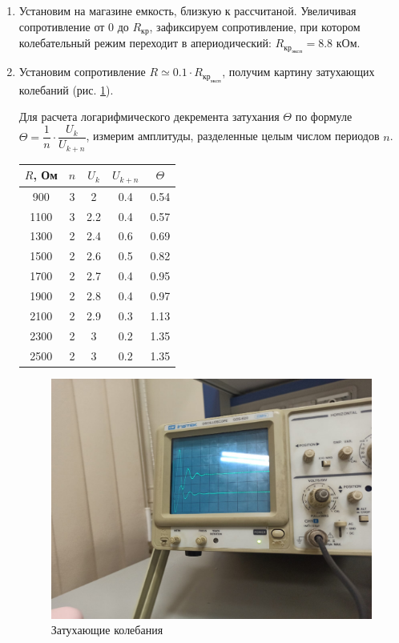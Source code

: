 \documentclass[a4paper, 12pt]{article}
\begin{document}
\begin{enumerate}
        \item Установим на магазине емкость, близкую к рассчитаной. Увеличивая сопротивление от $0$ до $R_{кр}$, зафиксируем сопротивление, при котором колебательный режим переходит в апериодический: $R_{кр_{эксп}} = 8.8$ кОм.
        \item Установим сопротивление $R \simeq 0.1 \cdot R_{кр_{эксп}}$, получим картину затухающих колебаний (рис. \ref{zatuh_koleb}).

        Для расчета логарифмического декремента затухания $\Theta$ по формуле $\Theta = \dfrac{1}{n} \cdot \dfrac{U_k}{U_{k+n}}$, измерим амплитуды, разделенные целым числом периодов $n$.

        \begin{tabular}{|c|c|c|c|c|} \hline
            $R$, Ом & $n$ & $U_k$ & $U_{k+n}$ & $\Theta$ \\ \hline
            900 & 3 & 2 & 0.4 & 0.54\\ \hline
            1100 & 3 & 2.2 & 0.4 & 0.57\\ \hline
            1300 & 2 & 2.4 & 0.6 & 0.69\\ \hline
            1500 & 2 & 2.6 & 0.5 & 0.82\\ \hline
            1700 & 2 & 2.7 & 0.4 & 0.95\\ \hline
            1900 & 2 & 2.8 & 0.4 & 0.97\\ \hline
            2100 & 2 & 2.9 & 0.3 & 1.13\\ \hline
            2300 & 2 & 3   & 0.2 & 1.35\\ \hline
            2500 & 2 & 3   & 0.2 & 1.35\\ \hline
        \end{tabular}

        \begin{figure}
            \includegraphics[scale=0.25]{zatuh_koleb.jpg}
            \caption{Затухающие колебания}
            \label{zatuh_koleb}
        \end{figure}


\end{enumerate}
\end{document}

